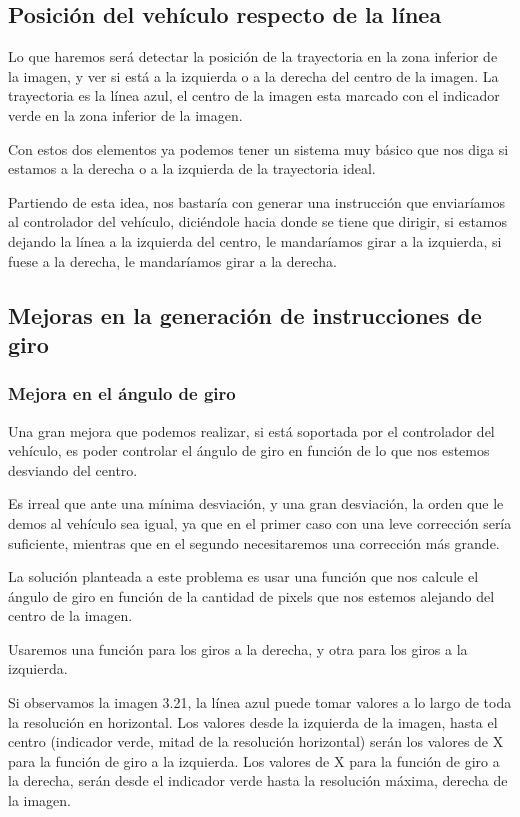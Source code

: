 
\subsection{Posición del vehículo respecto de la línea}
Lo que haremos será detectar la posición de la trayectoria en la zona inferior de la imagen, y ver si está a la izquierda o a la derecha del centro de la imagen. La trayectoria es la línea azul, el centro de la imagen esta marcado con el indicador verde en la zona inferior de la imagen.

Con estos dos elementos ya podemos tener un sistema muy básico que nos diga si estamos a la derecha o a la izquierda de la trayectoria ideal.

Partiendo de esta idea, nos bastaría con generar una instrucción que enviaríamos al controlador del vehículo, diciéndole hacia donde se tiene que dirigir, si estamos dejando la línea a la izquierda del centro, le mandaríamos girar a la izquierda, si fuese a la derecha, le mandaríamos girar a la derecha.

\subsection{Mejoras en la generación de instrucciones de giro}

\subsubsection{Mejora en el ángulo de giro}
Una gran mejora que podemos realizar, si está soportada por el controlador del vehículo, es poder controlar el ángulo de giro en función de lo que nos estemos desviando del centro. 

Es irreal que ante una mínima desviación, y una gran desviación, la orden que le demos al vehículo sea igual, ya que en el primer caso con una leve corrección sería suficiente, mientras que en el segundo necesitaremos una corrección más grande.

La solución planteada a este problema es usar una función que nos calcule el ángulo de giro en función de la cantidad de pixels que nos estemos alejando del centro de la imagen. 

Usaremos una función para los giros a la derecha, y otra para los giros a la izquierda.

Si observamos la imagen 3.21, la línea azul puede tomar valores a lo largo de toda la resolución en horizontal. Los valores desde la izquierda de la imagen, hasta el centro (indicador verde, mitad de la resolución horizontal) serán los valores de X para la función de giro a la izquierda. Los valores de X para la función de giro a la derecha, serán desde el indicador verde hasta la resolución máxima, derecha de la imagen.


